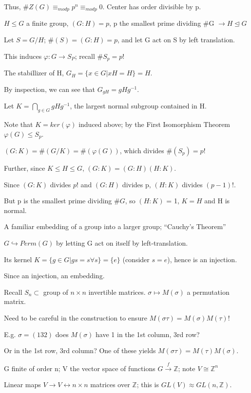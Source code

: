 \documentclass[12pt]{article}
\begin{document}
Thus, $\#Z(G) \equiv_{mod p} p^n \equiv_{mod p} 0$. Center has order divisible by p.

\noindent
$H \leq G$ a finite group, $(G : H) = p$, p the smallest prime dividing \#G $\to H \trianglelefteq G$

Let $S = G\slash H$; $\#(S) = (G : H) = p$, and let G act on S by left translation.

This induces $\varphi: G \to S_P$; recall $\#S_p = p!$

The stabillizer of H, $G_H = \{x \in G | xH = H\} = H$.

By inspection, we can see that $G_{gH} = gHg^{-1}$.

Let $K = \bigcap_{g \in G}gHg^{-1}$, the largest normal subgroup contained in H.

Note that $K = ker(\varphi)$ induced above; by the First Isomorphism Theorem $\varphi(G) \leq S_p$.

$(G : K) = \#(G\slash K) = \#(\varphi(G))$, which divides $\#(S_p) = p!$

Further, since $K \leq H \leq G$, $(G : K) = (G : H)(H : K)$.

Since $(G : K)$ divides $p!$ and $(G : H)$ divides p, $(H : K)$ divides $(p - 1)!$.

But p is the smallest prime dividing $\#G$, so $(H : K)$ = 1, $K = H$ and H is normal.

\noindent
A familiar embedding of a group into a larger group; ``Cauchy's Theorem''

$G \hookrightarrow Perm(G)$ by letting G act on itself by left-translation.

Its kernel $K = \{g \in G | gs=s \forall s\} = \{e\}$ (consider $s = e$), hence is an injection.

Since an injection, an embedding.

\noindent
Recall $S_n \subset$ group of $n \times n$ invertible matrices. $\sigma \mapsto M(\sigma)$ a permutation matrix.

Need to be careful in the construction to ensure $M(\sigma\tau)=M(\sigma)M(\tau)$!

E.g. $\sigma = (1 3 2)$ does $M(\sigma)$ have 1 in the 1st column, 3rd row?

Or in the 1st row, 3rd column?  One of these yields $M(\sigma\tau) = M(\tau)M(\sigma)$.

\noindent
G finite of order n; V the vector space of functions $G \xrightarrow{f} \mathds{Z}$; note $V \cong \mathds{Z}^n$

Linear maps $V \to V \leftrightarrow n \times n$ matrices over $\mathds{Z}$; this is $GL(V) \approx GL(n, \mathds{Z})$.
\end{document}
